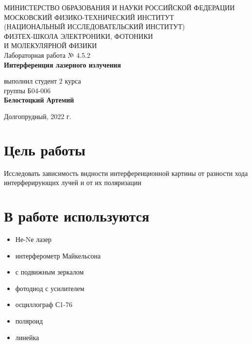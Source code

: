 \documentclass[a4paper,12pt]{article}
\begin{document}
 

\begin{titlepage}
	\begin{center}
		\large 	МИНИСТЕРСТВО ОБРАЗОВАНИЯ И НАУКИ РОССИЙСКОЙ ФЕДЕРАЦИИ\\
				МОСКОВСКИЙ ФИЗИКО-ТЕХНИЧЕСКИЙ ИНСТИТУТ \\
				(НАЦИОНАЛЬНЫЙ ИССЛЕДОВАТЕЛЬСКИЙ ИНСТИТУТ)\\ 
				ФИЗТЕХ-ШКОЛА ЭЛЕКТРОНИКИ, ФОТОНИКИ \\
				И МОЛЕКУЛЯРНОЙ ФИЗИКИ \\
		
		
		\vspace{4.0 cm}
		Лабораторная работа № 4.5.2 \\ 
		\LARGE \textbf{Интерференция лазерного излучения}
	\end{center}
	\vspace{3 cm} \large
	
	\begin{flushright}
		выполнил студент 2 курса \\
		{группы Б04-006}\\
		\textbf{Белостоцкий Артемий}\\
	\end{flushright}
	
	\vfill

	\begin{center}
	Долгопрудный, 2022 г.
	\end{center}
\end{titlepage}                                                                      

\section*{Цель работы}
Исследовать зависимость видности интерференционной картины от разности хода интерферирующих лучей и от их поляризации

\section*{В работе используются}
\begin{itemize}
\item Не-Nе лазер
\item интерферометр Майкельсона
\item с подвижным зеркалом 
\item фотодиод с усилителем 
\item осциллограф С1-76
\item поляроид
\item линейка
\end{itemize}
\end{document}
